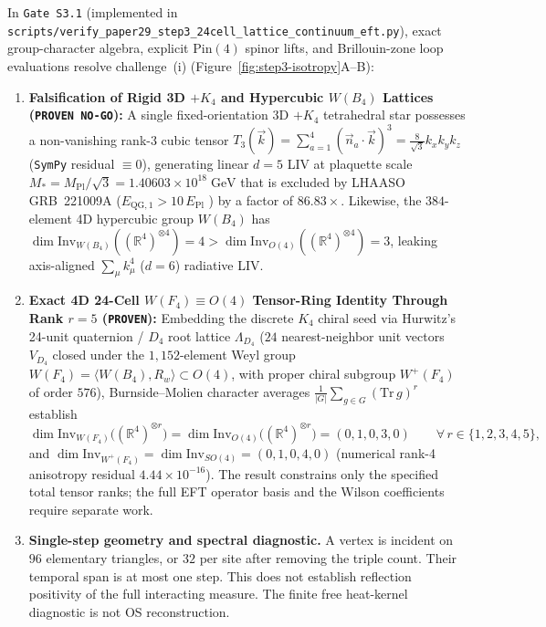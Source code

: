 \documentclass[11pt,a4paper]{article}
\begin{document}
In \texttt{Gate S3.1} (implemented in \texttt{scripts/\allowbreak verify\_\allowbreak paper29\_\allowbreak step3\_\allowbreak 24cell\_\allowbreak lattice\_\allowbreak continuum\_\allowbreak eft.py}), exact group-character algebra, explicit $\mathrm{Pin}(4)$ spinor lifts, and Brillouin-zone loop evaluations resolve challenge~(i) (Figure~\ref{fig:step3-isotropy}A--B):
\begin{enumerate}
    \item \textbf{Falsification of Rigid 3D $+K_4$ and Hypercubic $W(B_4)$ Lattices (\texttt{PROVEN NO-GO}):} A single fixed-orientation 3D $+K_4$ tetrahedral star possesses a non-vanishing rank-3 cubic tensor $T_3(\vec{k}) = \sum_{a=1}^4 (\vec{n}_a\cdot\vec{k})^3 = \frac{8}{\sqrt{3}}k_x k_y k_z$ (\texttt{SymPy} residual $\equiv 0$), generating linear $d = 5$ LIV at plaquette scale $M_* = M_{\mathrm{Pl}}/\sqrt{3} = 1.40603\times 10^{18}\;\mathrm{GeV}$ that is excluded by LHAASO GRB~221009A ($E_{\mathrm{QG},1} > 10\,E_{\mathrm{Pl}}$ \cite{LHAASO2023}) by a factor of $86.83\times$. Likewise, the $384$-element 4D hypercubic group $W(B_4)$ has $\dim\mathrm{Inv}_{W(B_4)}((\mathbb{R}^4)^{\otimes 4}) = 4 > \dim\mathrm{Inv}_{O(4)}((\mathbb{R}^4)^{\otimes 4}) = 3$, leaking axis-aligned $\sum_\mu k_\mu^4$ ($d = 6$) radiative LIV.
    \item \textbf{Exact 4D 24-Cell $W(F_4) \equiv O(4)$ Tensor-Ring Identity Through Rank $r = 5$ (\texttt{PROVEN}):} Embedding the discrete $K_4$ chiral seed via Hurwitz's 24-unit quaternion / $D_4$ root lattice $\Lambda_{D_4}$ ($24$ nearest-neighbor unit vectors $V_{D_4}$ closed under the $1{,}152$-element Weyl group $W(F_4) = \langle W(B_4), R_w\rangle \subset O(4)$, with proper chiral subgroup $W^+(F_4)$ of order $576$), Burnside--Molien character averages $\frac{1}{|G|}\sum_{g\in G}(\mathrm{Tr}\,g)^r$ establish
    \begin{equation}
        \dim\mathrm{Inv}_{W(F_4)}\bigl((\mathbb{R}^4)^{\otimes r}\bigr) = \dim\mathrm{Inv}_{O(4)}\bigl((\mathbb{R}^4)^{\otimes r}\bigr) = (0, 1, 0, 3, 0) \qquad \forall\, r \in \{1, 2, 3, 4, 5\},
        \label{eq:wf4-isotropy}
    \end{equation}
    and $\dim\mathrm{Inv}_{W^+(F_4)} = \dim\mathrm{Inv}_{SO(4)} = (0, 1, 0, 4, 0)$ (numerical rank-4 anisotropy residual $4.44\times 10^{-16}$). The result constrains only the specified total tensor ranks; the full EFT operator basis and the Wilson coefficients require separate work.
    \item \textbf{Single-step geometry and spectral diagnostic.} A vertex is incident on $96$ elementary triangles, or $32$ per site after removing the triple count. Their temporal span is at most one step. This does not establish reflection positivity of the full interacting measure. The finite free heat-kernel diagnostic is not OS reconstruction.
\end{enumerate}
\end{document}
